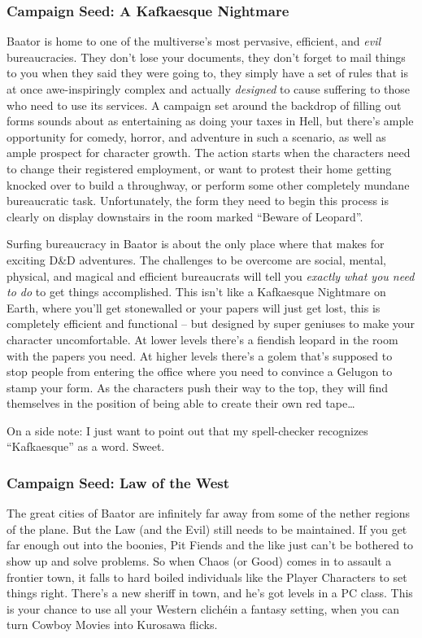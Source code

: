 \subsubsection{Campaign Seed: A Kafkaesque Nightmare}

Baator is home to one of the multiverse's most pervasive, efficient, and \textit{evil} bureaucracies. They don't lose your documents, they don't forget to mail things to you when they said they were going to, they simply have a set of rules that is at once awe-inspiringly complex and actually \textit{designed} to cause suffering to those who need to use its services. A campaign set around the backdrop of filling out forms sounds about as entertaining as doing your taxes in Hell, but there's ample opportunity for comedy, horror, and adventure in such a scenario, as well as ample prospect for character growth. The action starts when the characters need to change their registered employment, or want to protest their home getting knocked over to build a throughway, or perform some other completely mundane bureaucratic task. Unfortunately, the form they need to begin this process is clearly on display downstairs in the room marked ``Beware of Leopard''.

Surfing bureaucracy in Baator is about the only place where that makes for exciting D\&D adventures. The challenges to be overcome are social, mental, physical, and magical and efficient bureaucrats will tell you \textit{exactly what you need to do} to get things accomplished. This isn't like a Kafkaesque Nightmare on Earth, where you'll get stonewalled or your papers will just get lost, this is completely efficient and functional -- but designed by super geniuses to make your character uncomfortable. At lower levels there's a fiendish leopard in the room with the papers you need. At higher levels there's a golem that's supposed to stop people from entering the office where you need to convince a Gelugon to stamp your form. As the characters push their way to the top, they will find themselves in the position of being able to create their own red tape\ldots

On a side note: I just want to point out that my spell-checker recognizes ``Kafkaesque'' as a word. Sweet.

\subsubsection{Campaign Seed: Law of the West}

The great cities of Baator are infinitely far away from some of the nether regions of the plane. But the Law (and the Evil) still needs to be maintained. If you get far enough out into the boonies, Pit Fiends and the like just can't be bothered to show up and solve problems. So when Chaos (or Good) comes in to assault a frontier town, it falls to hard boiled individuals like the Player Characters to set things right. There's a new sheriff in town, and he's got levels in a PC class. This is your chance to use all your Western clichéin a fantasy setting, when you can turn Cowboy Movies into Kurosawa flicks.

